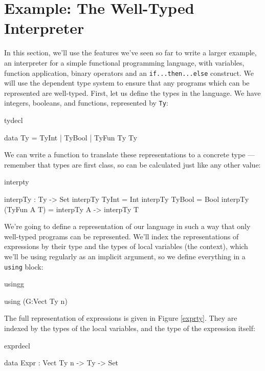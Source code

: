 \section{Example: The Well-Typed Interpreter}

In this section, we'll use the features we've seen so far to write a larger
example, an interpreter for a simple functional programming language, with
variables, function application, binary operators and an \texttt{if...then...else}
construct. We will use the dependent type system to ensure that any programs
which can be represented are well-typed. First, let us define the types in the
language. We have integers, booleans, and functions, represented by \texttt{Ty}:

\begin{SaveVerbatim}{tydecl}

data Ty = TyInt | TyBool | TyFun Ty Ty

\end{SaveVerbatim}

\noindent
We can write a function to translate these representations to a concrete \Idris{}
type --- remember that types are first class, so can be calculated just like
any other value:

\begin{SaveVerbatim}{interpty}

interpTy : Ty -> Set
interpTy TyInt       = Int
interpTy TyBool      = Bool
interpTy (TyFun A T) = interpTy A -> interpTy T

\end{SaveVerbatim}

\noindent
We're going to define a representation of our language in such a way that only
well-typed programs can be represented. We'll index the representations of
expressions by their type and the types of local variables (the context), which
we'll be using regularly as an implicit argument, so we define everything
in a \texttt{using} block:

\begin{SaveVerbatim}{usingg}

using (G:Vect Ty n)

\end{SaveVerbatim}

\noindent
The full representation of expressions is given in Figure \ref{exprty}. They are
indexed by the types of the local variables, and the type of the expression itself:

\begin{SaveVerbatim}{exprdecl}

data Expr : Vect Ty n -> Ty -> Set

\end{SaveVerbatim}

